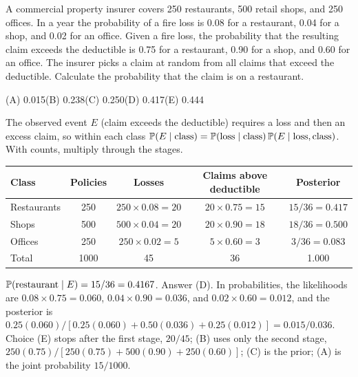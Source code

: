 \begin{example}
A commercial property insurer covers 250 restaurants, 500 retail shops, and 250 offices. In
a year the probability of a fire loss is 0.08 for a restaurant, 0.04 for a shop, and 0.02
for an office. Given a fire loss, the probability that the resulting claim exceeds the
deductible is 0.75 for a restaurant, 0.90 for a shop, and 0.60 for an office. The insurer
picks a claim at random from all claims that exceed the deductible. Calculate the
probability that the claim is on a restaurant.
\par\smallskip\noindent (A) 0.015\qquad (B) 0.238\qquad (C) 0.250\qquad (D) 0.417\qquad (E) 0.444
\end{example}
\begin{solution}
The observed event $E$ (claim exceeds the deductible) requires a loss and then an excess
claim, so within each class $\mathbb{P}(E \mid \text{class}) = \mathbb{P}(\text{loss} \mid \text{class})
\,\mathbb{P}(E \mid \text{loss}, \text{class})$. With counts, multiply through the stages.
\begin{center}
\begin{tabular}{@{}lcccc@{}}
\toprule
Class & Policies & Losses & Claims above deductible & Posterior \\
\midrule
Restaurants & 250 & $250 \times 0.08 = 20$ & $20 \times 0.75 = 15$ & $15/36 = 0.417$ \\
Shops       & 500 & $500 \times 0.04 = 20$ & $20 \times 0.90 = 18$ & $18/36 = 0.500$ \\
Offices     & 250 & $250 \times 0.02 = 5$  & $5 \times 0.60 = 3$   & $3/36 = 0.083$ \\
\midrule
Total & 1000 & 45 & 36 & 1.000 \\
\bottomrule
\end{tabular}
\end{center}
$\mathbb{P}(\text{restaurant} \mid E) = 15/36 = 0.4167$. Answer (D). In probabilities, the
likelihoods are $0.08 \times 0.75 = 0.060$, $0.04 \times 0.90 = 0.036$, and
$0.02 \times 0.60 = 0.012$, and the posterior is $0.25(0.060)/[0.25(0.060) + 0.50(0.036) + 0.25(0.012)]
= 0.015/0.036$. Choice (E) stops after the first stage, $20/45$; (B) uses only the second
stage, $250(0.75)/[250(0.75) + 500(0.90) + 250(0.60)]$; (C) is the prior; (A) is the joint
probability $15/1000$.
\end{solution}

